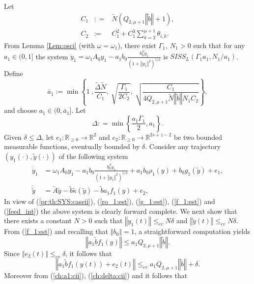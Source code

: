 \documentclass[letterpaper, 10pt]{article}
\newcommand{\rref}[1]{(\ref{#1})}
\newcommand{\norme}[1]{\left\Vert #1\right\Vert}
\newcommand{\reels}{\mathbb{R}}
\begin{document}
Let 
\begin{eqnarray}
 \label{def:C:cii}
C_1 &: =& \tilde{N} ( Q_{2,\mu+1} \norme{\tilde{b}} + 1 ), \\ \label{def:rho1ov:cii}
C_2 &:=  & C_1^2 + C_1^3 \sum\limits_{k=2}^{\mu +1} \theta_{i,k} .
\end{eqnarray} From Lemma \ref{Lem:osci} (with $\omega = \omega_1$), there exist $\Gamma_1, \: N_1 >0$ such that for any $a_1 \in (0,1]$ the system
$\dot{y}_1 = \omega_1 A_0 y_1  -  a_1 b_0 \frac{b_0^T y_1}{(1 + \norme{y_1}^2 )^{1/2}} $ is $SISS_L( \Gamma_1 a_1  , N_1 / a_1 ) $. Define
\begin{equation}
\label{ch:a1:cii}
\overline{a}_1 := \min \left\lbrace 1 \: ,  \frac{\tilde{\Delta}  \tilde{N}}{C_1 } ,\:  \sqrt{\frac{ \Gamma_1 }{2 C_2}}, \: \sqrt{ \frac{C_1}{4  Q_{2,\mu+1} \tilde{N} \norme{\tilde{b}} N_1 C_2 }}\right\rbrace,
\end{equation}and choose $a_1 \in (0 ,\overline{a}_1 ]$.  Let 
\begin{equation}
\label{ch:delta:cii}
\Delta: =  \min \left\lbrace  \frac{a_1   \Gamma_1 }{2}, a_1 \right\rbrace.
\end{equation}
Given $\delta \leq \Delta$, let $e_1 : \reels_{\geq 0} \rightarrow \reels^2 $ and $e_2 :\reels_{\geq 0}  \rightarrow  \reels^{2s+z-2}$ be two bounded measurable functions, eventually bounded by $\delta$. Consider any trajectory $(y_1(\cdot) , \tilde{y}(\cdot) )$ of the following system
\begin{align}
\label{proof:prop1:SYS:caseii:pert}
 \dot{y}_1 & = \omega_1 A_0 y_1  -  a_1 b_0 \frac{b_0^T y_1}{(1 + \norme{y_1}^2 )^{1/2}} + a_1 b_0 \rho_1(y) + b_0 g_1(\tilde{y}) +e_1, \nonumber \\
  \dot{\tilde{y}} & = \tilde{A} \tilde{y}  - \tilde{b}  \tilde{\kappa} (\tilde{y})  - \tilde{b}  a_1 f_1(y) + e_2,
\end{align}In view of \rref{pr:th:SYS:caseii}, \rref{ro_1:est}, \rref{g_1:est}, \rref{f_1:est} and \rref{feed_int} the above system is clearly forward complete. We next show that there exists a constant $N >0$ such that $\norme{y_1(t)} \leq_{ev} N \delta$ and $\norme{\tilde{y}(t)}\leq_{ev} N \delta$. 
From \rref{f_1:est} and recalling that $\norme{b_0}=1$, a straightforward computation yields
\begin{equation*}
\norme{a_1  \tilde{b} f_1(y)} \leq a_1 Q_{2,\mu +1} \norme{\tilde{b}}.
\end{equation*} Since $\norme{e_2(t) } \leq_{ev} \delta $, it follows that
\begin{equation*}
\norme{a_1  \tilde{b} f_1(y(t)) + e_2(t) }\leq_{ev}  a_1 Q_{2,\mu +1} \norme{\tilde{b}} + \delta.
\end{equation*}Moreover from \rref{ch:a1:cii}, \rref{ch:delta:cii} and  it follows that
\end{document}
